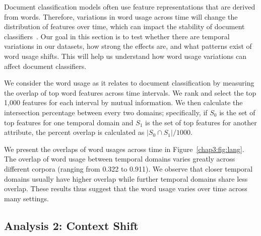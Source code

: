 Document classification models often use feature representations that are derived from words. Therefore, variations in word usage across time will change the distribution of features over time, which can impact the stability of document classifiers~\cite{huang2018examining}. 
Our goal in this section is to test whether there are temporal variations in our datasets, how strong the effects are, and what patterns exist of word usage shifts. This will help us understand how word usage variations can affect document classifiers.

We consider the word usage as it relates to document classification by measuring the overlap of top word features across time intervals. We rank and select the top 1,000 features for each interval by mutual information. We then calculate the intersection percentage between every two domains; 
specifically, if $S_0$ is the set of top features for one temporal domain and $S_1$ is the set of top features for another attribute, the percent overlap is calculated as $|S_0 \cap S_1|/1000$.

We present the overlaps of word usages across time in Figure~\ref{chap3:fig:lang}.
The overlap of word usage between temporal domains varies greatly across different corpora (ranging from 0.322 to 0.911). We  observe that closer temporal domains usually have higher overlap while further temporal domains share less overlap. These results thus suggest that the word usage varies over time across many settings.


\subsection{Analysis 2: Context Shift}
\label{chap3:subsec:ctt_shift}

